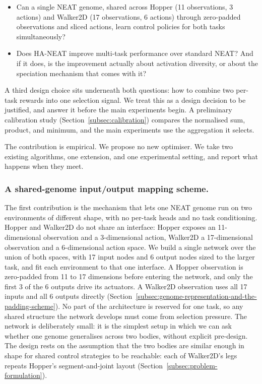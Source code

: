 \begin{itemize}
    \item Can a single NEAT genome, shared across Hopper (11 observations, 3 actions) and Walker2D (17 observations, 6 actions) through zero-padded observations and sliced actions, learn control policies for both tasks simultaneously?
    \item Does HA-NEAT improve multi-task performance over standard NEAT? And if it does, is the improvement actually about activation diversity, or about the speciation mechanism that comes with it?
\end{itemize}
A third design choice sits underneath both questions: how to combine two per-task rewards into one selection signal.
We treat this as a design decision to be justified, and answer it before the main experiments begin.
A preliminary calibration study (Section~\ref{subsec:calibration}) compares the normalised sum, product, and minimum, and the main experiments use the aggregation it selects.

The contribution is empirical.
We propose no new optimiser. We take two existing algorithms, one extension, and one experimental setting, and report what happens when they meet.

\subsubsection{A shared-genome input/output mapping scheme.}
The first contribution is the mechanism that lets one NEAT genome run on two environments of different shape, with no per-task heads and no task conditioning.
Hopper and Walker2D do not share an interface: Hopper exposes an 11-dimensional observation and a 3-dimensional action, Walker2D a 17-dimensional observation and a 6-dimensional action space.
We build a single network over the union of both spaces, with 17 input nodes and 6 output nodes sized to the larger task, and fit each environment to that one interface.
A Hopper observation is zero-padded from 11 to 17 dimensions before entering the network, and only the first 3 of the 6 outputs drive its actuators. A Walker2D observation uses all 17 inputs and all 6 outputs directly (Section~\ref{subsec:genome-representation-and-the-padding-scheme}).
No part of the architecture is reserved for one task, so any shared structure the network develops must come from selection pressure.
The network is deliberately small: it is the simplest setup in which we can ask whether one genome generalises across two bodies, without explicit pre-design.
The design rests on the assumption that the two bodies are similar enough in shape for shared control strategies to be reachable: each of Walker2D's legs repeats Hopper's segment-and-joint layout (Section~\ref{subsec:problem-formulation}).

